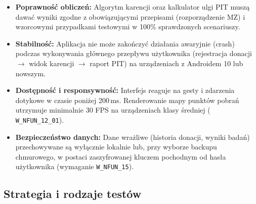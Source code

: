 \documentclass[11pt, a4paper]{article}
\newcommand{\req}[1]{\texttt{#1}}
\begin{document}
\begin{itemize}
  \item \textbf{Poprawność obliczeń:} Algorytm karencji oraz kalkulator ulgi PIT muszą
        dawać wyniki zgodne z obowiązującymi przepisami (rozporządzenie MZ) i wzorcowymi
        przypadkami testowymi w 100\% sprawdzonych scenariuszy.

  \item \textbf{Stabilność:} Aplikacja nie może zakończyć działania awaryjnie (crash)
        podczas wykonywania głównego przepływu użytkownika (rejestracja donacji $\to$
        widok karencji $\to$ raport PIT) na urządzeniach z Androidem 10 lub nowszym.

  \item \textbf{Dostępność i responsywność:} Interfejs reaguje na gesty i zdarzenia
        dotykowe w czasie poniżej 200\,ms. Renderowanie mapy punktów pobrań utrzymuje
        minimalnie 30 FPS na urządzeniach klasy średniej ( \req{W\_NFUN\_12\_01}).

  \item \textbf{Bezpieczeństwo danych:} Dane wrażliwe (historia donacji, wyniki badań)
        przechowywane są wyłącznie lokalnie lub, przy wyborze backupu chmurowego,
        w postaci zaszyfrowanej kluczem pochodnym od hasła użytkownika
        (wymaganie \req{W\_NFUN\_15}).

\end{itemize}

\subsection{Strategia i rodzaje testów}
\end{document}

